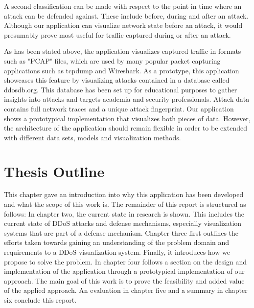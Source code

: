 A second classification can be made with respect to the point in time where an attack can be defended against. These include before, during and after an attack.
Although our application can visualize network state before an attack, it would presumably prove most useful for traffic captured during or after an attack\cite{zargar}.

As has been stated above, the application visualizes captured traffic in formats such as "PCAP" files, which are used by many popular packet capturing applications such as tcpdump and Wireshark. As a prototype, this application showcases this feature by visualizing attacks contained in a database called ddosdb.org. This database has been set up for educational purposes to gather insights into attacks and targets academia and security professionals. Attack data contains full network traces and a unique attack fingerprint\cite{ddosdb}. Our application shows a prototypical implementation that visualizes both pieces of data. However, the architecture of the application should remain flexible in order to be extended with different data sets, models and visualization methods.

\section{Thesis Outline}

This chapter gave an introduction into why this application has been developed and what the scope of this work is. The remainder of this report is structured as follows: In chapter two, the current state in research is shown. This includes the current state of DDoS attacks and defense mechanisms, especially visualization systems that are part of a defense mechanism. Chapter three first outlines the efforts taken towards gaining an understanding of the problem domain and requirements to a DDoS visualization system. Finally, it introduces how we propose to solve the problem. In chapter four follows a section on the design and implementation of the application through a prototypical implementation of our approach. The main goal of this work is to prove the feasibility and added value of the applied approach. An evaluation in chapter five and a summary in chapter six conclude this report.